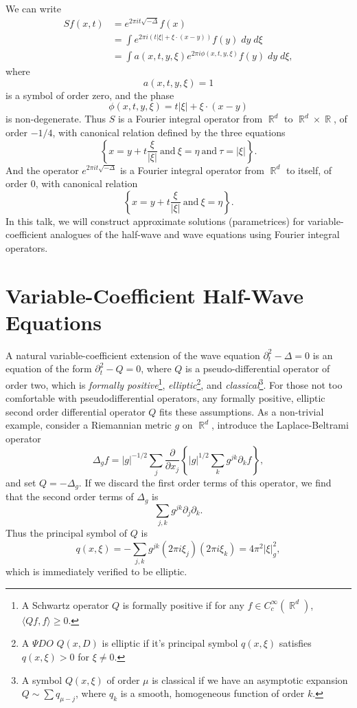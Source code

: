 \documentclass{article}
\theoremstyle{plain}
\theoremstyle{remark}
\theoremstyle{definition}
\DeclareMathOperator{\RR}{\mathbb{R}}
\begin{document}
We can write
%
\begin{align*}
	Sf(x,t) &= e^{2 \pi it \sqrt{-\Delta}} f(x)\\
	&= \int e^{2 \pi i (t |\xi| + \xi \cdot (x - y))} f(y)\; dy\; d\xi\\
	&= \int a(x,t,y,\xi) e^{2 \pi i \phi(x,t,y,\xi)} f(y)\; dy\; d\xi,
\end{align*}
%
where
%
\[ a(x,t,y,\xi) = 1 \]
%
is a symbol of order zero, and the phase
%
\[ \phi(x,t,y,\xi) = t |\xi| + \xi \cdot (x - y) \]
%
is non-degenerate. Thus $S$ is a Fourier integral operator from $\RR^d$ to $\RR^d \times \RR$, of order $-1/4$, with canonical relation defined by the three equations
%
\[ \left\{ x = y + t \frac{\xi}{|\xi|}\ \text{and}\ \xi = \eta\ \text{and}\ \tau = |\xi| \right\}. \]
%
And the operator $e^{2 \pi i t \sqrt{-\Delta}}$ is a Fourier integral operator from $\RR^d$ to itself, of order $0$, with canonical relation
%
\[ \left\{ x = y + t \frac{\xi}{|\xi|}\ \text{and}\ \xi = \eta \right\}. \]
%
In this talk, we will construct approximate solutions (parametrices) for variable-coefficient analogues of the half-wave and wave equations using Fourier integral operators.

\section{Variable-Coefficient Half-Wave Equations}

A natural variable-coefficient extension of the wave equation $\partial_t^2 - \Delta = 0$ is an equation of the form $\partial_t^2 - Q = 0$, where $Q$ is a pseudo-differential operator of order two, which is \emph{formally positive}\footnote{A Schwartz operator $Q$ is formally positive if for any $f \in C_c^\infty(\RR^d)$, $\langle Qf, f \rangle \geq 0$.}, \emph{elliptic}\footnote{A ${\Psi}DO$ $Q(x,D)$ is elliptic if it's principal symbol $q(x,\xi)$ satisfies $q(x,\xi) > 0$ for $\xi \neq 0$.}, and \emph{classical}\footnote{A symbol $Q(x,\xi)$ of order $\mu$ is classical if we have an asymptotic expansion $Q \sim \sum q_{\mu-j}$, where $q_k$ is a smooth, homogeneous function of order $k$.}. For those not too comfortable with pseudodifferential operators, any formally positive, elliptic second order differential operator $Q$ fits these assumptions. As a non-trivial example, consider a Riemannian metric $g$ on $\RR^d$, introduce the Laplace-Beltrami operator
%
\[ \Delta_g f = |g|^{-1/2} \sum_j \frac{\partial}{\partial x_j} \left\{ |g|^{1/2} \sum_k g^{jk} \partial_k f \right\}, \]
%
and set $Q = - \Delta_g$. If we discard the first order terms of this operator, we find that the second order terms of $\Delta_g$ is
%
\[ \sum_{j,k} g^{jk} \partial_j \partial_k. \]
%
Thus the principal symbol of $Q$ is
%
\[ q(x,\xi) = - \sum_{j,k} g^{jk} ( 2 \pi i \xi_j ) (2 \pi i \xi_k) = 4 \pi^2 |\xi|_g^2, \]
%
which is immediately verified to be elliptic.
\end{document}
